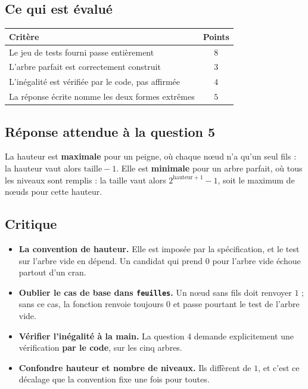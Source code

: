\subsection*{Ce qui est évalué}

\begin{center}
\begin{tabular}{|l|c|}
\hline
\textbf{Critère} & \textbf{Points} \\
\hline
Le jeu de tests fourni passe entièrement & $8$ \\
\hline
L'arbre parfait est correctement construit & $3$ \\
\hline
L'inégalité est vérifiée par le code, pas affirmée & $4$ \\
\hline
La réponse écrite nomme les deux formes extrêmes & $5$ \\
\hline
\end{tabular}
\end{center}

\subsection*{Réponse attendue à la question 5}

La hauteur est \textbf{maximale} pour un peigne, où chaque nœud n'a qu'un seul
fils : la hauteur vaut alors $\text{taille} - 1$. Elle est \textbf{minimale}
pour un arbre parfait, où tous les niveaux sont remplis : la taille vaut alors
$2^{\text{hauteur}+1} - 1$, soit le maximum de nœuds pour cette hauteur.

\subsection*{Critique}

\begin{itemize}
  \item \textbf{La convention de hauteur.} Elle est imposée par la
    spécification, et le test sur l'arbre vide en dépend. Un candidat qui prend
    $0$ pour l'arbre vide échoue partout d'un cran.
  \item \textbf{Oublier le cas de base dans \lstinline{feuilles}.} Un nœud sans
    fils doit renvoyer $1$ ; sans ce cas, la fonction renvoie toujours $0$ et
    passe pourtant le test de l'arbre vide.
  \item \textbf{Vérifier l'inégalité à la main.} La question 4 demande
    explicitement une vérification \textbf{par le code}, sur les cinq arbres.
  \item \textbf{Confondre hauteur et nombre de niveaux.} Ils diffèrent de $1$,
    et c'est ce décalage que la convention fixe une fois pour toutes.
\end{itemize}

